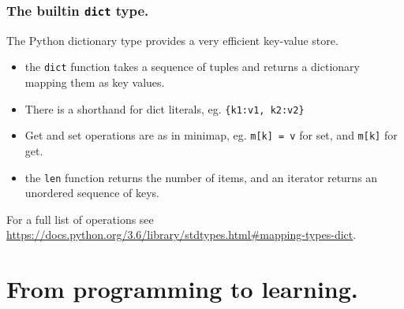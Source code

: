 \documentclass{beamer} %
\begin{document}

\begin{frame}
\frametitle{The builtin \texttt{dict} type.}

The Python dictionary type provides a very efficient key-value store.
\begin{itemize}
  \item the \texttt{dict} function takes a sequence of tuples and returns a dictionary mapping them as key values.
  \item There is a shorthand for dict literals, eg. \texttt{\{k1:v1, k2:v2\}}
  \item Get and set operations are as in minimap, eg. \texttt{m[k] = v} for set, and \texttt{m[k]} for get.
  \item the \texttt{len} function returns the number of items, and an iterator returns an unordered sequence of keys.
\end{itemize}

\vspace{3mm} 
For a full list of operations see \url{https://docs.python.org/3.6/library/stdtypes.html\#mapping-types-dict}.

\end{frame}

\section{From programming to learning.}
\end{document}
